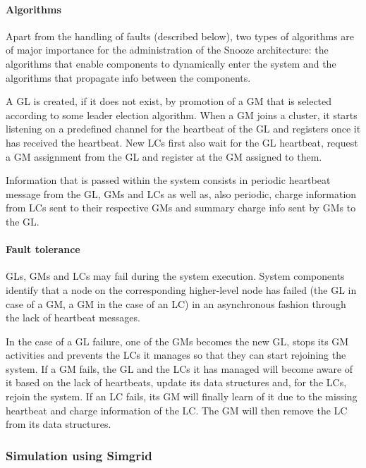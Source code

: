 \paragraph{Algorithms}
\label{sec:snoozeAlgs}

Apart from the handling of faults (described below), two types of
algorithms are of major importance for the administration of the
Snooze architecture: the algorithms that enable components to
dynamically enter the system and the algorithms that propagate info
between the components.

A GL is created, if it does not exist, by promotion of a GM that is
selected according to some leader election algorithm. When a GM joins
a cluster, it starts listening on a predefined channel for the
heartbeat of the GL and registers once it has received the
heartbeat. New LCs first also wait for the GL heartbeat, request a GM
assignment from the GL and register at the GM assigned to them.

Information that is passed within the system consists in periodic
heartbeat message from the GL, GMs and LCs as well as, also periodic,
charge information from LCs sent to their respective GMs and summary
charge info sent by GMs to the GL.


\paragraph{Fault tolerance} 

GLs, GMs and LCs may fail during the system execution. System
components identify that a node on the corresponding higher-level node
has failed (the GL in case of a GM, a GM in the case of an LC) in an
asynchronous fashion through the lack of heartbeat messages.

In the case of a GL failure, one of the GMs becomes the new GL, stops
its GM activities and prevents the LCs it manages so that they can
start rejoining the system. If a GM fails, the GL and the LCs it has
managed will become aware of it based on the lack of heartbeats,
update its data structures and, for the LCs, rejoin the system. If an
LC fails, its GM will finally learn of it due to the missing heartbeat
and charge information of the LC. The GM will then remove the LC from
its data structures.

\subsubsection{Simulation using Simgrid}

